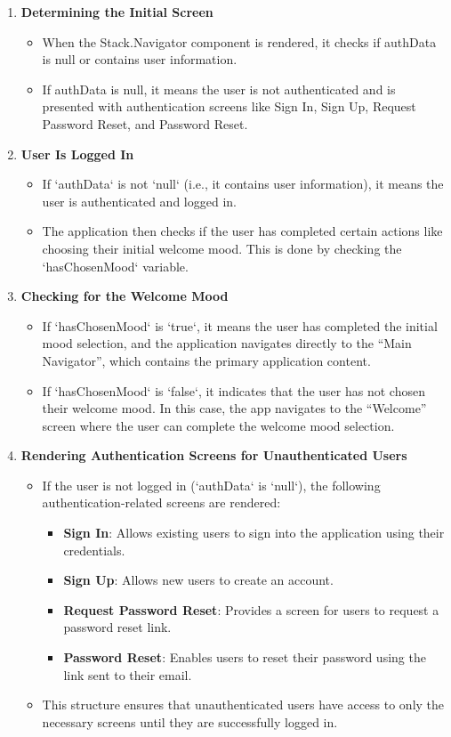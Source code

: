 \begin{enumerate} \item \textbf{Determining the Initial Screen} \begin{itemize} \item When the Stack.Navigator component is rendered, it checks if authData is null or contains user information. \item If authData is null, it means the user is not authenticated and is presented with authentication screens like Sign In, Sign Up, Request Password Reset, and Password Reset. \end{itemize}
    \item \textbf{User Is Logged In}
\begin{itemize}
    \item If `authData` is not `null` (i.e., it contains user information), it means the user is authenticated and logged in.
    \item The application then checks if the user has completed certain actions like choosing their initial welcome mood. This is done by checking the `hasChosenMood` variable.
\end{itemize}

\item \textbf{Checking for the Welcome Mood}
\begin{itemize}
    \item If `hasChosenMood` is `true`, it means the user has completed the initial mood selection, and the application navigates directly to the ``Main Navigator'', which contains the primary application content.
    \item If `hasChosenMood` is `false`, it indicates that the user has not chosen their welcome mood. In this case, the app navigates to the ``Welcome'' screen where the user can complete the welcome mood selection.
\end{itemize}

\item \textbf{Rendering Authentication Screens for Unauthenticated Users}
\begin{itemize}
    \item If the user is not logged in (`authData` is `null`), the following authentication-related screens are rendered:
        \begin{itemize}
            \item \textbf{Sign In}: Allows existing users to sign into the application using their credentials.
            \item \textbf{Sign Up}: Allows new users to create an account.
            \item \textbf{Request Password Reset}: Provides a screen for users to request a password reset link.
            \item \textbf{Password Reset}: Enables users to reset their password using the link sent to their email.
        \end{itemize}
    \item This structure ensures that unauthenticated users have access to only the necessary screens until they are successfully logged in.
\end{itemize}


\end{enumerate}
